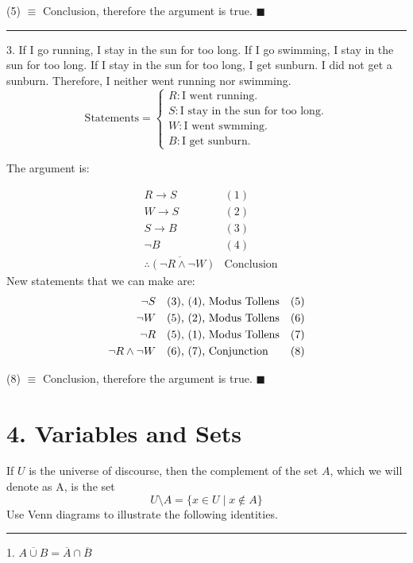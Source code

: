 \documentclass[]{article}
\begin{document}
\begin{center}
    (5) $\equiv$ Conclusion, therefore the argument is true. $\blacksquare$
\end{center}
\hrule
\vspace{0.1in}
3. If I go running, I stay in the sun for too long. If I go swimming, I stay in the sun for too long.
If I stay in the sun for too long, I get sunburn. I did not get a sunburn. Therefore, I neither
went running nor swimming.\[
    \text{Statements} = 
    \begin{cases*}
         R: \text{I went running.} \\
         S: \text{I stay in the sun for too long.} \\
         W: \text{I went swmming.}\\
         B: \text{I get sunburn.}
    \end{cases*}
\]

The argument is:

\begin{align*}
    & R \rightarrow S & (1)\\
    & W \rightarrow S & (2)\\
    & S \rightarrow B  & (3) \\
    & \neg B & (4) \\
    & \overline{\therefore (\neg R \land \neg W)} & \text{Conclusion}
\end{align*}
New statements that we can make are:
\begin{align*}
    \neg S \quad & \text{(3), (4), Modus Tollens} \hfill & (5) \\
    \neg W \quad & \text{(5), (2), Modus Tollens} \hfill & (6) \\
    \neg R \quad & \text{(5), (1), Modus Tollens} \hfill & (7) \\
    \neg R \land \neg W \quad & \text{(6), (7), Conjunction} \hfill & (8)
\end{align*}

\begin{center}
    (8) $\equiv$ Conclusion, therefore the argument is true. $\blacksquare$
\end{center}

\section*{4. Variables and Sets}

If $U$ is the universe of discourse, then the complement of the set $A$, which we will denote as A, is the set 
$$U \text{\textbackslash} A = \{x \in U \mid x \notin A\}$$
Use Venn diagrams to illustrate the following identities.
\vspace{0.1in}
\hrule
\vspace{0.1in}
1. $\overline{A \cup B} = \overline{A} \cap \overline{B}$
\end{document}
